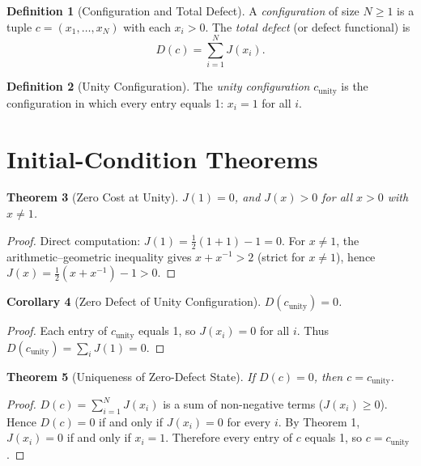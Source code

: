 \documentclass[12pt,a4paper]{article}
\newtheorem{theorem}{Theorem}[section]
\newtheorem{corollary}[theorem]{Corollary}
\theoremstyle{definition}
\newtheorem{definition}[theorem]{Definition}
\theoremstyle{remark}
\begin{document}
\begin{definition}[Configuration and Total Defect]
A \emph{configuration} of size $N \geq 1$ is a tuple $c = (x_1, \ldots, x_N)$
with each $x_i > 0$.
The \emph{total defect} (or defect functional) is
\begin{equation}
D(c) = \sum_{i=1}^{N} J(x_i).
\end{equation}
\end{definition}

\begin{definition}[Unity Configuration]
The \emph{unity configuration} $c_{\mathrm{unity}}$ is the configuration
in which every entry equals 1: $x_i = 1$ for all $i$.
\end{definition}

\section{Initial-Condition Theorems}

\begin{theorem}[Zero Cost at Unity]
$J(1) = 0$, and $J(x) > 0$ for all $x > 0$ with $x \neq 1$.
\end{theorem}

\begin{proof}
Direct computation: $J(1) = \frac{1}{2}(1 + 1) - 1 = 0$.
For $x \neq 1$, the arithmetic--geometric inequality gives
$x + x^{-1} > 2$ (strict for $x \neq 1$), hence
$J(x) = \frac{1}{2}(x + x^{-1}) - 1 > 0$.
\end{proof}

\begin{corollary}[Zero Defect of Unity Configuration]
$D(c_{\mathrm{unity}}) = 0$.
\end{corollary}

\begin{proof}
Each entry of $c_{\mathrm{unity}}$ equals 1, so $J(x_i) = 0$ for all $i$.
Thus $D(c_{\mathrm{unity}}) = \sum_i J(1) = 0$.
\end{proof}

\begin{theorem}[Uniqueness of Zero-Defect State]
If $D(c) = 0$, then $c = c_{\mathrm{unity}}$.
\end{theorem}

\begin{proof}
$D(c) = \sum_{i=1}^{N} J(x_i)$ is a sum of non-negative terms ($J(x_i) \geq 0$).
Hence $D(c) = 0$ if and only if $J(x_i) = 0$ for every $i$.
By Theorem 1, $J(x_i) = 0$ if and only if $x_i = 1$.
Therefore every entry of $c$ equals 1, so $c = c_{\mathrm{unity}}$.
\end{proof}
\end{document}

